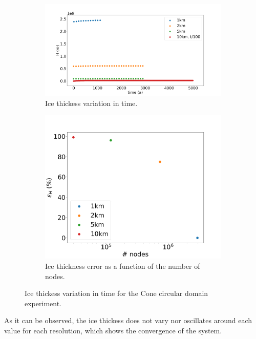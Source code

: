 \documentclass{article}
\begin{document}
\begin{figure}[!h]
	\centering
	\begin{subfigure}{.5\textwidth}
		\centering
		\includegraphics[width=1.1\linewidth]{../fig/H_CONE_full_all_res_vs_time.png}
		\caption{Ice thickess variation in time.}
		\label{H_CONE_VS_TIME}
	\end{subfigure}%
	\begin{subfigure}{.5\textwidth}
		\centering
		\includegraphics[width=1.1\linewidth]{../fig/H_CONE_full_all_res_vs_num_nodes.png}
		\caption{Ice thickness error as a function of the number of nodes.}
		\label{H_CONE_VS_NODES}
	\end{subfigure}
	\caption{Ice thickess variation in time for the Cone circular domain experiment.}
	\label{H_CONE_VS_TIME_VS_NODES}
\end{figure}

As it can be observed, the ice thickess does not vary nor oscillates around each value for each resolution, which shows the convergence of the system.
\end{document}
